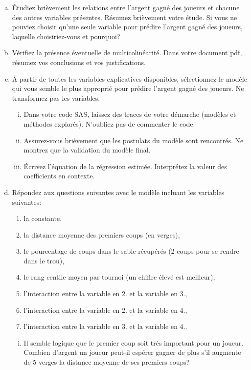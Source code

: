 \documentclass[letter, 11pt]{article}
\begin{document}
\begin{enumerate}[(a)]
\item Étudiez brièvement les relations entre l'argent gagné des joueurs et chacune des autres variables présentes. Résumez brièvement votre étude. Si vous ne pouviez choisir qu'une seule variable pour prédire l'argent gagné des joueurs, laquelle choisiriez-vous et pourquoi?
%
\item Vérifiez la présence éventuelle de multicolinéarité. Dans votre document pdf, résumez vos conclusions et vos justifications.  
%
\item À partir de toutes les variables explicatives disponibles, sélectionnez le modèle qui vous semble le plus approprié pour prédire l'argent gagné des joueurs. Ne transformez pas les variables.
    \begin{enumerate}[(i)]
    \item Dans votre code SAS, laissez des traces de votre démarche (modèles et méthodes explorés). N'oubliez pas de commenter le code.
    \item Assurez-vous brièvement que les postulats du modèle sont rencontrés. Ne montrez que la validation du modèle final.
    \item  Écrivez l'équation de la régression estimée. Interprétez la valeur des coefficients en contexte.
    \end{enumerate}
\item  Répondez aux questions suivantes avec le modèle incluant les variables suivantes:
\begin{enumerate}[1.]
	\item la constante,
	\item la distance moyenne des premiers coups (en verges),
	\item le pourcentage de coups dans le sable récupérés (2 coups pour se rendre dans le trou),
	\item le rang centile moyen par tournoi (un chiffre élevé est meilleur),
	\item l'interaction entre la variable en 2. et la variable en 3.,
	\item l'interaction entre la variable en 2. et la variable en 4.,
	\item l'interaction entre la variable en 3. et la variable en 4..
\end{enumerate}
    \begin{enumerate}[(i)]
    	\item Il semble logique que le premier coup soit très important pour un joueur. Combien d'argent un joueur peut-il espérer gagner de plus s'il augmente de 5 verges la distance moyenne de ses premiers coups?

\end{enumerate}
\end{enumerate}
\end{document}
